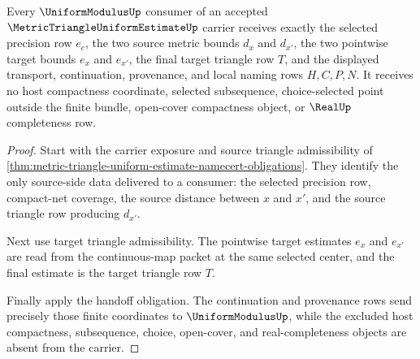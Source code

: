 \begin{theorem}
\label{thm:metric-triangle-uniform-estimate-consumer-handoff}
Every $\UniformModulusUp$ consumer of an accepted $\MetricTriangleUniformEstimateUp$ carrier receives exactly the selected precision row $e_c$, the two source metric bounds $d_x$ and $d_{x'}$, the two pointwise target bounds $e_x$ and $e_{x'}$, the final target triangle row $T$, and the displayed transport, continuation, provenance, and local naming rows $H,C,P,N$. It receives no host compactness coordinate, selected subsequence, choice-selected point outside the finite bundle, open-cover compactness object, or $\RealUp$ completeness row.
\end{theorem}
\begin{proof}
Start with the carrier exposure and source triangle admissibility of \autoref{thm:metric-triangle-uniform-estimate-namecert-obligations}. They identify the only source-side data delivered to a consumer: the selected precision row, compact-net coverage, the source distance between $x$ and $x'$, and the source triangle row producing $d_{x'}$.

Next use target triangle admissibility. The pointwise target estimates $e_x$ and $e_{x'}$ are read from the continuous-map packet at the same selected center, and the final estimate is the target triangle row $T$.

Finally apply the handoff obligation. The continuation and provenance rows send precisely those finite coordinates to $\UniformModulusUp$, while the excluded host compactness, subsequence, choice, open-cover, and real-completeness objects are absent from the carrier.
\end{proof}

